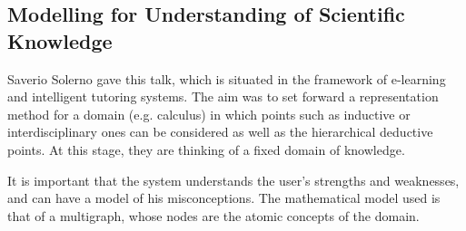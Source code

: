 \documentclass[11pt, a4paper]{article}
\begin{document}
\subsection{Modelling for Understanding of Scientific Knowledge}
Saverio Solerno gave this talk, which is situated in the framework of
e-learning and intelligent tutoring systems. The aim was to set forward a
representation method for a domain (e.g. calculus) in which points such as
inductive or interdisciplinary ones can be considered as well as the
hierarchical deductive points. At this stage, they are thinking of a fixed
domain of knowledge.
\par
It is important that the system understands the user's strengths and
weaknesses, and can have a model of his misconceptions. The mathematical
model used is that of a multigraph, whose nodes are the atomic concepts of
the domain.
\end{document}
